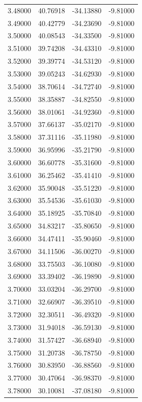 \begin{table}
\begin{tabular}{llll}
3.48000 & 40.76918 & -34.13880 & -9.81000 \\
3.49000 & 40.42779 & -34.23690 & -9.81000 \\
3.50000 & 40.08543 & -34.33500 & -9.81000 \\
3.51000 & 39.74208 & -34.43310 & -9.81000 \\
3.52000 & 39.39774 & -34.53120 & -9.81000 \\
3.53000 & 39.05243 & -34.62930 & -9.81000 \\
3.54000 & 38.70614 & -34.72740 & -9.81000 \\
3.55000 & 38.35887 & -34.82550 & -9.81000 \\
3.56000 & 38.01061 & -34.92360 & -9.81000 \\
3.57000 & 37.66137 & -35.02170 & -9.81000 \\
3.58000 & 37.31116 & -35.11980 & -9.81000 \\
3.59000 & 36.95996 & -35.21790 & -9.81000 \\
3.60000 & 36.60778 & -35.31600 & -9.81000 \\
3.61000 & 36.25462 & -35.41410 & -9.81000 \\
3.62000 & 35.90048 & -35.51220 & -9.81000 \\
3.63000 & 35.54536 & -35.61030 & -9.81000 \\
3.64000 & 35.18925 & -35.70840 & -9.81000 \\
3.65000 & 34.83217 & -35.80650 & -9.81000 \\
3.66000 & 34.47411 & -35.90460 & -9.81000 \\
3.67000 & 34.11506 & -36.00270 & -9.81000 \\
3.68000 & 33.75503 & -36.10080 & -9.81000 \\
3.69000 & 33.39402 & -36.19890 & -9.81000 \\
3.70000 & 33.03204 & -36.29700 & -9.81000 \\
3.71000 & 32.66907 & -36.39510 & -9.81000 \\
3.72000 & 32.30511 & -36.49320 & -9.81000 \\
3.73000 & 31.94018 & -36.59130 & -9.81000 \\
3.74000 & 31.57427 & -36.68940 & -9.81000 \\
3.75000 & 31.20738 & -36.78750 & -9.81000 \\
3.76000 & 30.83950 & -36.88560 & -9.81000 \\
3.77000 & 30.47064 & -36.98370 & -9.81000 \\
3.78000 & 30.10081 & -37.08180 & -9.81000 \\

\end{tabular}
\end{table}

